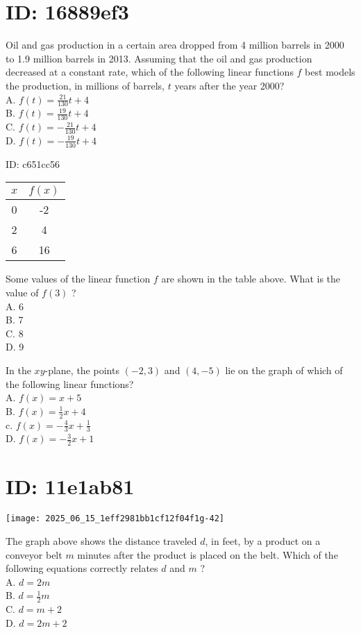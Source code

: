 \section*{ID: 16889ef3}
Oil and gas production in a certain area dropped from 4 million barrels in 2000 to 1.9 million barrels in 2013. Assuming that the oil and gas production decreased at a constant rate, which of the following linear functions $f$ best models the production, in millions of barrels, $t$ years after the year 2000?\\
A. $f(t)=\frac{21}{130} t+4$\\
B. $f(t)=\frac{19}{130} t+4$\\
C. $f(t)=-\frac{21}{130} t+4$\\
D. $f(t)=-\frac{19}{130} t+4$

ID: c651cc56

\begin{center}
\begin{tabular}{|c|c|}
\hline
$x$ & $f(x)$ \\
\hline
0 & -2 \\
\hline
2 & 4 \\
\hline
6 & 16 \\
\hline
\end{tabular}
\end{center}

Some values of the linear function $f$ are shown in the table above. What is the value of $f(3)$ ?\\
A. 6\\
B. 7\\
C. 8\\
D. 9

In the $x y$-plane, the points $(-2,3)$ and $(4,-5)$ lie on the graph of which of the following linear functions?\\
A. $f(x)=x+5$\\
B. $f(x)=\frac{1}{2} x+4$\\
c. $f(x)=-\frac{4}{3} x+\frac{1}{3}$\\
D. $f(x)=-\frac{3}{2} x+1$

\section*{ID: 11e1ab81}
\begin{center}
\texttt{[image: 2025\_06\_15\_1eff2981bb1cf12f04f1g-42]}
\end{center}

The graph above shows the distance traveled $d$, in feet, by a product on a conveyor belt $m$ minutes after the product is placed on the belt. Which of the following equations correctly relates $d$ and $m$ ?\\
A. $d=2 m$\\
B. $d=\frac{1}{2} m$\\
C. $d=m+2$\\
D. $d=2 m+2$

